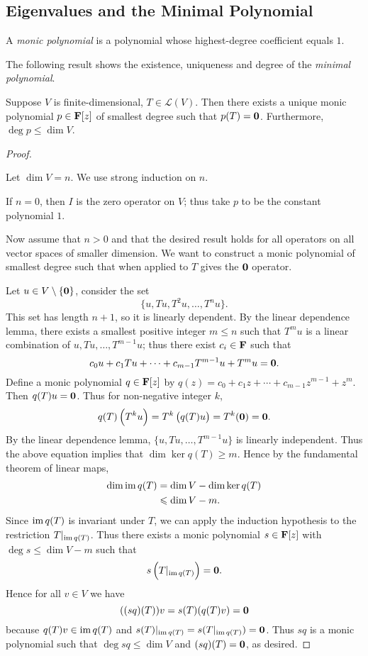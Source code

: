 \subsection{Eigenvalues and the Minimal Polynomial}
A \emph{monic polynomial} is a polynomial whose highest-degree coefficient equals $1$.

The following result shows the existence, uniqueness and degree of the \emph{minimal polynomial}.

\begin{lemma}
Suppose $V$ is finite-dimensional, $T\in\mathcal{L}(V)$. Then there exists a unique monic polynomial $p\in\mathbf F[z]$ of smallest degree such that $p(T)=\vb{0}$. Furthermore, $\deg p\le\dim V$.
\end{lemma}

\begin{proof} \

 Let $\dim V=n$. We use strong induction on $n$.

If $n=0$, then $I$ is the zero operator on $V$; thus take $p$ to be the constant polynomial $1$.

Now assume that $n>0$ and that the desired result holds for all operators on all vector spaces of smaller dimension. We want to construct a monic polynomial of smallest degree such that when applied to $T$ gives the $\vb{0}$ operator.

Let $u\in V\setminus\{\vb{0}\}$, consider the set
\[\{u,Tu,T^2u,\dots,T^nu\}.\]
This set has length $n+1$, so it is linearly dependent. By the linear dependence lemma, there exists a smallest positive integer $m\le n$ such that $T^mu$ is a linear combination of $u,Tu,\dots,T^{m-1}u$; thus there exist $c_i\in\mathbf F$ such that
\[c_0u+c_1Tu+\cdots+c_{m-1}T^{m-1}u+T^mu=\vb{0}.\]
Define a monic polynomial $q\in\mathbf F[z]$ by $q(z)=c_0+c_1z+\cdots+c_{m-1}z^{m-1}+z^m$. Then $q(T)u=\vb{0}$. Thus for non-negative integer $k$,
\[q(T)\left(T^ku\right)=T^k\left(q(T)u\right)=T^k(\vb{0})=\vb{0}.\]
By the linear dependence lemma, $\{u,Tu,\dots,T^{m-1}u\}$ is linearly independent. Thus the above equation implies that $\dim\ker q(T)\ge m$. Hence by the fundamental theorem of linear maps,
\begin{align*}
\dim\operatorname{im} q(T)&=\dim V-\dim\ker q(T)\\
&\leqslant\dim V-m.
\end{align*}
Since $\operatorname{im} q(T)$ is invariant under $T$, we can apply the induction hypothesis to the restriction $T|_{\operatorname{im} q(T)}$. Thus there exists a monic polynomial $s\in\mathbf F[z]$ with $\deg s\le \dim V-m$ such that
\[s\left(T|_{\operatorname{im} q(T)}\right)=\vb{0}.\]
Hence for all $v\in V$ we have
\[((sq)(T))v=s(T)(q(T)v)=\vb{0}\]
because $q(T)v\in\operatorname{im} q(T)$ and $s(T)|_{\operatorname{im} q(T)}=s(T|_{\operatorname{im} q(T)})=\vb{0}$. Thus $sq$ is a monic polynomial such that $\deg sq\le\dim V$ and $(sq)(T)=\vb{0}$, as desired.


\end{proof}
